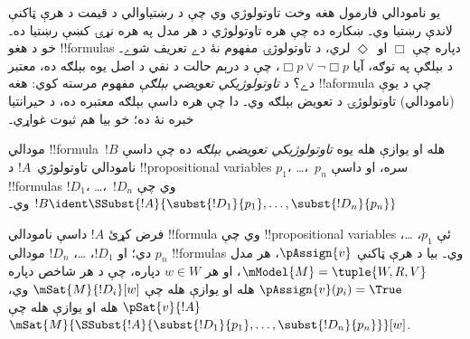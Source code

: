 \documentclass[../../../include/open-logic-section]{subfiles}
\begin{document}


\begin{explain}
يو نامودالي فارمول هغه وخت تاوتولوژي وي چې د رښتياوالي د قيمت د هرې
ټاکنې لاندې رښتيا وي۔ ښکاره ده چې هره تاوتولوژي د هر مدل په هره نړۍ
کښې رښتيا ده۔ خو د هغو !!{formula}s دپاره چې $\Box$ او~$\Diamond$
لري، د تاوتولوژۍ مفهوم نۀ دے تعريف شوے۔ د بېلګې په توګه، آيا
$\Box p \lor \lnot \Box p$، چې د درېم حالت د نفي د اصل يوه بېلګه
ده، معتبر دے؟ د \emph{تاوتولوژيکي تعويضي بېلګې} مفهوم مرسته کوي:
هغه !!a{formula} چې د يوې (نامودالي) تاوتولوژۍ د تعويض بېلګه وي۔
دا چې هره داسې بېلګه معتبره ده، د حيرانتيا خبره نۀ ده؛ خو بيا هم
ثبوت غواړي۔
\end{explain}

\begin{defn}
  مودالي !!{formula}~$!B$ هله او يوازې هله يوه \emph{تاوتولوژيکي
    تعويضي بېلګه} ده چې داسې نامودالي تاوتولوژي~$!A$ د !!{propositional
    variable}s $p_1$، \dots،~$p_n$ سره، او داسې !!{formula}s $!D_1$،
  \dots،~$!D_n$ وي چې $!B \ident \SSubst{!A}{\subst{!D_1}{p_1},
    \dots, \subst{!D_n}{p_n}}$ وي۔
\end{defn}

\begin{lem}
  فرض کړئ $!A$ داسې نامودالي !!{formula} وي چې !!{propositional
  variable}s ئې $p_1$، \dots، $p_n$ دي؛ او $!D_1$، \dots،
  $!D_n$ مودالي !!{formula}s وي۔ بيا د هرې ټاکنې $\pAssign{v}$،
  هر مدل $\mModel{M} = \tuple{W, R, V}$، او هر $w \in W$ دپاره،
  چې د هر شاخص دپاره $\pAssign{v}(p_i) = \True$ هله او يوازې هله چې
  $\mSat{M}{!D_i}[w]$ وي، $\pSat{v}{!A}$ هله او يوازې هله چې
  $\mSat{M}{\SSubst{!A}{\subst{!D_1}{p_1}, \dots,
      \subst{!D_n}{p_n}}}[w]$.
\end{lem}
\end{document}
